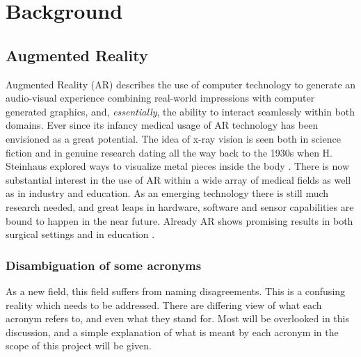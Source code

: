 


\chapter{Background}


\section{Augmented Reality}


Augmented Reality (AR) describes the use of computer technology to generate an audio-visual experience combining real-world impressions with computer generated graphics, and, \textit{essentially}, the ability to interact seamlessly within both domains. Ever since its infancy medical usage of AR technology has been envisioned as a great potential. The idea of x-ray vision is seen both in science fiction and in genuine research dating all the way back to the 1930s when H. Steinhaus explored ways to visualize metal pieces inside the body \citep{Sielhorst2008}. There is now substantial interest in the use of AR within a wide array of medical fields as well as in industry and education. As an emerging technology there is still much research needed, and great leaps in hardware, software and sensor capabilities are bound to happen in the near future. Already AR shows promising results in both surgical settings and in education \citep{Singh2013}.


\subsection*{Disambiguation of some acronyms}\label{chap:armrxr}
As a new field, this field suffers from naming disagreements. This is a confusing reality which needs to be addressed. There are differing view of what each acronym refers to, and even what they stand for. Most will be overlooked in this discussion, and a simple explanation of what is meant by each acronym in the scope of this project will be given.

